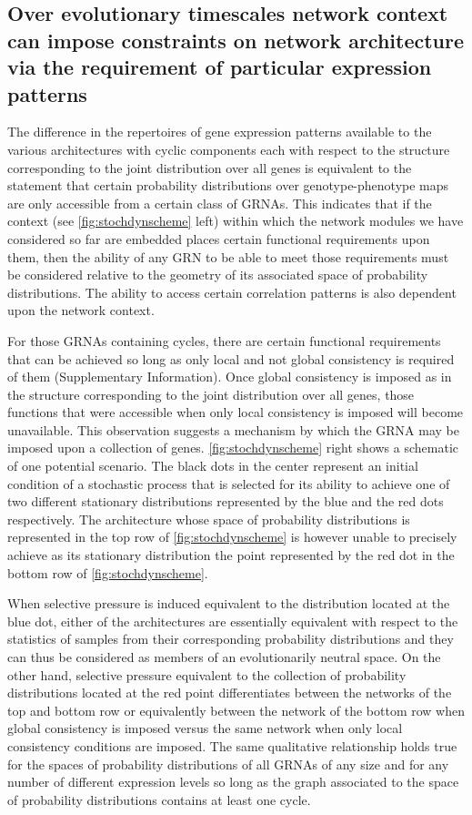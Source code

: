 \subsection{Over evolutionary timescales network context can impose constraints on network architecture via the requirement of particular expression patterns}

The difference in the repertoires of gene expression patterns available to the various architectures with cyclic components each with respect to the structure corresponding to the joint distribution over all genes is equivalent to the statement that certain probability distributions over genotype-phenotype maps are only accessible from a certain class of GRNAs. This indicates that if the context (see \ref{fig:stochdynscheme} left) within which the network modules we have considered so far are embedded places certain functional requirements upon them, then the ability of any GRN to be able to meet those requirements must be considered relative to the geometry of its associated space of probability distributions. The ability to access certain correlation patterns is also dependent upon the network context.

For those GRNAs containing cycles, there are certain functional requirements that can be achieved so long as only local and not global consistency is required of them (Supplementary Information). Once global consistency is imposed as in the structure corresponding to the joint distribution over all genes, those functions that were accessible when only local consistency is imposed will become unavailable. This observation suggests a mechanism by which the GRNA may be imposed upon a collection of genes. \ref{fig:stochdynscheme} right shows a schematic of one potential scenario. The black dots in the center represent an initial condition of a stochastic process that is selected for its ability to achieve one of two different stationary distributions represented by the blue and the red dots respectively. The architecture whose space of probability distributions is represented in the top row of \ref{fig:stochdynscheme} is however unable to precisely achieve as its stationary distribution the point represented by the red dot in the bottom row of \ref{fig:stochdynscheme}.

When selective pressure is induced equivalent to the distribution located at the blue dot, either of the architectures are essentially equivalent with respect to the statistics of samples from their corresponding probability distributions and they can thus be considered as members of an evolutionarily neutral space. On the other hand, selective pressure equivalent to the collection of probability distributions located at the red point differentiates between the networks of the top and bottom row or equivalently between the network of the bottom row when global consistency is imposed versus the same network when only local consistency conditions are imposed. The same qualitative relationship holds true for the spaces of probability distributions of all GRNAs of any size and for any number of different expression levels so long as the graph associated to the space of probability distributions contains at least one cycle.
